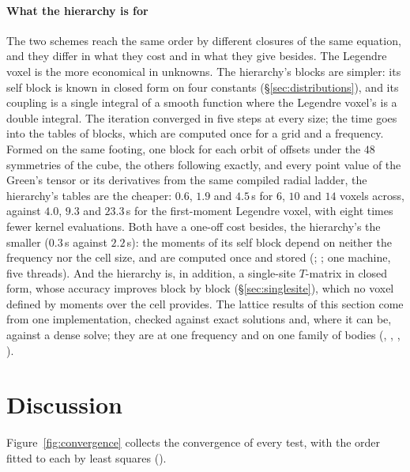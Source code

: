 \documentclass[preprint,review,12pt]{elsarticle}
\begin{document}
\paragraph{What the hierarchy is for} The two schemes reach the same order by different closures of
the same equation, and they differ in what they cost and in what they give besides. The Legendre voxel
is the more economical in unknowns. The hierarchy's blocks are simpler: its self block is known in
closed form on four constants (\S\ref{sec:distributions}), and its coupling is a single integral of a
smooth function where the Legendre voxel's is a double integral. The iteration converged in five steps
at every size; the time goes into the tables of blocks, which are computed once for a grid and a
frequency. Formed on the same footing, one block for each orbit of offsets under the $48$ symmetries of
the cube, the others following exactly, and every point value of the Green's tensor or its derivatives
from the same compiled radial ladder, the hierarchy's tables are the cheaper: $0.6$, $1.9$ and
$4.5$\,s for $6$, $10$ and $14$ voxels across, against $4.0$, $9.3$ and $23.3$\,s for the first-moment
Legendre voxel, with eight times fewer kernel evaluations. Both have a one-off cost besides, the
hierarchy's the smaller ($0.3$\,s against $2.2$\,s): the moments of its self block depend on neither
the frequency nor the cell size, and are computed once and stored
(; ; one machine,
five threads). And the hierarchy is, in
addition, a single-site $T$-matrix in closed form, whose accuracy improves block by block
(\S\ref{sec:singlesite}), which no voxel defined by moments over the cell provides. The lattice results
of this section come from one implementation, checked against exact solutions and, where it can be,
against a dense solve; they are at one frequency and on one family of bodies
(, ,
,
).

\FloatBarrier

\section{Discussion}\label{sec:discussion}

Figure~\ref{fig:convergence} collects the convergence of every test, with the order fitted to each by
least squares ().
\end{document}
